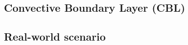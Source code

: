
\clearpage

\clearpage

\subsection{Convective Boundary Layer (CBL)}


\clearpage

\clearpage

\subsection{Real-world scenario}


\clearpage

\clearpage


